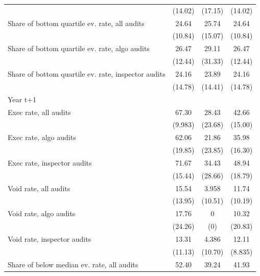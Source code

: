{\begin{tabular}{l*{3}{c}}
            &     (14.02)         &     (17.15)         &     (14.02)         \\
Share of bottom quartile ev. rate, all audits&       24.64         &       25.74         &       24.64         \\
            &     (10.84)         &     (15.07)         &     (10.84)         \\
Share of bottom quartile ev. rate, algo audits&       26.47         &       29.11         &       26.47         \\
            &     (12.44)         &     (31.33)         &     (12.44)         \\
Share of bottom quartile ev. rate, inspector audits&       24.16         &       23.89         &       24.16         \\
            &     (14.78)         &     (14.41)         &     (14.78)         \\
Year t+1    &                     &                     &                     \\
Exec rate, all audits&       67.30         &       28.43         &       42.66         \\
            &     (9.983)         &     (23.68)         &     (15.00)         \\
Exec rate, algo audits&       62.06         &       21.86         &       35.98         \\
            &     (19.85)         &     (23.85)         &     (16.30)         \\
Exec rate, inspector audits&       71.67         &       34.43         &       48.94         \\
            &     (15.44)         &     (28.66)         &     (18.79)         \\
Void rate, all audits&       15.54         &       3.958         &       11.74         \\
            &     (13.95)         &     (10.51)         &     (10.19)         \\
Void rate, algo audits&       17.76         &           0         &       10.32         \\
            &     (24.26)         &         (0)         &     (20.83)         \\
Void rate, inspector audits&       13.31         &       4.386         &       12.11         \\
            &     (11.13)         &     (10.70)         &     (8.835)         \\
Share of below median ev. rate, all audits&       52.40         &       39.24         &       41.93         \\

\end{tabular}}
